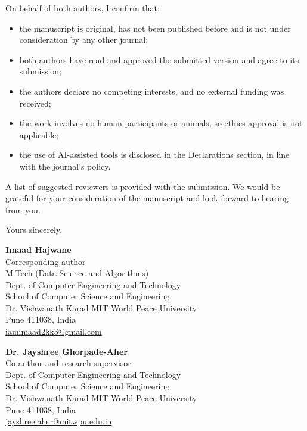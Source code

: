 \documentclass[11pt,a4paper]{article}
\begin{document}
On behalf of both authors, I confirm that:
\begin{itemize}[leftmargin=*,itemsep=1pt,topsep=0pt]
\item the manuscript is original, has not been published before and is not under consideration by any other journal;
\item both authors have read and approved the submitted version and agree to its submission;
\item the authors declare no competing interests, and no external funding was received;
\item the work involves no human participants or animals, so ethics approval is not applicable;
\item the use of AI-assisted tools is disclosed in the Declarations section, in line with the journal's policy.
\end{itemize}

A list of suggested reviewers is provided with the submission. We would be grateful for your consideration of the manuscript and look forward to hearing from you.

Yours sincerely,

\vspace{4pt}
\begin{minipage}[t]{0.49\textwidth}\raggedright
\textbf{Imaad Hajwane}\\
Corresponding author\\
M.Tech (Data Science and Algorithms)\\
Dept. of Computer Engineering and Technology\\
School of Computer Science and Engineering\\
Dr. Vishwanath Karad MIT World Peace University\\
Pune 411038, India\\
\href{mailto:iamimaad2kk3@gmail.com}{iamimaad2kk3@gmail.com}
\end{minipage}\hfill
\begin{minipage}[t]{0.49\textwidth}\raggedright
\textbf{Dr. Jayshree Ghorpade-Aher}\\
Co-author and research supervisor\\
Dept. of Computer Engineering and Technology\\
School of Computer Science and Engineering\\
Dr. Vishwanath Karad MIT World Peace University\\
Pune 411038, India\\
\href{mailto:jayshree.aher@mitwpu.edu.in}{jayshree.aher@mitwpu.edu.in}
\end{minipage}
\end{document}
